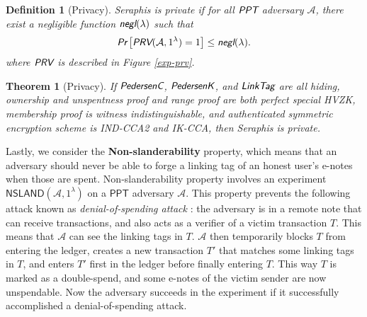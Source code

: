 \documentclass{article}
\theoremstyle{plain}
\newtheorem{definition}{Definition}[section]
\newtheorem{theorem}{Theorem}[section]
\theoremstyle{remark}
\begin{document}
\begin{definition}[Privacy]
Seraphis is private if for all $\emph{\textsf{PPT}}$ adversary $\mathcal{A}$, there exist a negligible function $\emph{\textsf{negl}}(\lambda)$ such that
\begin{align*}
\emph{\textsf{Pr}}
\left[
\emph{\textsf{PRV}}(\mathcal{A}, 1^{\lambda})=1
\right]
\le \emph{\textsf{negl}}(\lambda).
\end{align*}
where $\emph{\textsf{PRV}}$ is described in Figure \ref{exp-prv}.
\end{definition}
\begin{theorem}[Privacy]\label{thm-prv}
If $\emph{\textsf{PedersenC}}$, $\emph{\textsf{PedersenK}}$, and $\emph{\textsf{LinkTag}}$ are all hiding, ownership and unspentness proof and range proof are both perfect special HVZK, membership proof is witness indistinguishable, and authenticated symmetric encryption scheme is IND-CCA2 and IK-CCA, then Seraphis is private.  
\end{theorem}

Lastly, we consider the \textbf{Non-slanderability} property, which means that an adversary should never be able to forge a linking tag of an honest user's e-notes when those are spent. Non-slanderability property involves an experiment $\textsf{NSLAND}(\mathcal{A}, 1^{\lambda})$ on a $\textsf{PPT}$ adversary $\mathcal{A}$. This property prevents the following attack known as \textit{denial-of-spending attack} \cite{denial-of-spend}: the adversary is in a remote note that can receive transactions, and also acts as a verifier of a victim transaction $T$. This means that $\mathcal{A}$ can see the linking tags in $T$. $\mathcal{A}$ then temporarily blocks $T$ from entering the ledger, creates a new transaction $T'$ that matches some linking tags in $T$, and enters $T'$ first in the ledger before finally entering $T$. This way $T$ is marked as a double-spend, and some e-notes of the victim sender are now unspendable. Now the adversary succeeds in the experiment if it successfully accomplished a denial-of-spending attack.
\end{document}
